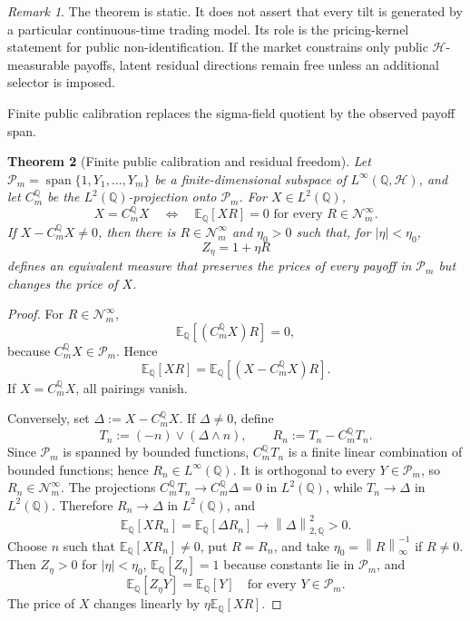 \documentclass[11pt,a4paper]{amsart}
\theoremstyle{plain}
\newtheorem{theorem}{Theorem}[section]
\theoremstyle{definition}
\theoremstyle{remark}
\newtheorem{remark}[theorem]{Remark}
\DeclareMathOperator{\Span}{span}
\newcommand{\QQ}{\mathbb{Q}}
\newcommand{\EE}{\mathbb{E}}
\newcommand{\cH}{\mathcal{H}}
\newcommand{\cN}{\mathcal{N}}
\newcommand{\cP}{\mathcal{P}}
\newcommand{\norm}[1]{\left\lVert #1\right\rVert}
\begin{document}
\begin{remark}
The theorem is static.  It does not assert that every tilt is generated by a particular
continuous-time trading model.  Its role is the pricing-kernel statement for public
non-identification.  If the market constrains only public \(\cH\)-measurable payoffs, latent
residual directions remain free unless an additional selector is imposed.
\end{remark}

Finite public calibration replaces the sigma-field quotient by the observed payoff span.

\begin{theorem}[Finite public calibration and residual freedom]\label{thm:finite-calibration}
Let \(\cP_m=\Span\{1,Y_1,\ldots,Y_m\}\) be a finite-dimensional subspace of
\(L^\infty(\QQ,\cH)\),
and let \(C_m^{\QQ}\) be the \(L^2(\QQ)\)-projection onto \(\cP_m\).  For \(X\in L^2(\QQ)\),
\[
        X=C_m^{\QQ}X
        \quad\Longleftrightarrow\quad
        \EE_\QQ[XR]=0
        \text{ for every }R\in\cN_m^\infty.
\]
If \(X-C_m^\QQ X\ne0\), then there is \(R\in\cN_m^\infty\) and \(\eta_0>0\) such that, for
\(|\eta|<\eta_0\),
\[
        Z_\eta=1+\eta R
\]
defines an equivalent measure that preserves the prices of every payoff in \(\cP_m\) but changes
the price of \(X\).
\end{theorem}

\begin{proof}
For \(R\in\cN_m^\infty\),
\[
        \EE_\QQ[(C_m^\QQ X)R]=0,
\]
because \(C_m^\QQ X\in\cP_m\).  Hence
\[
        \EE_\QQ[XR]=\EE_\QQ[(X-C_m^\QQ X)R].
\]
If \(X=C_m^\QQ X\), all pairings vanish.

Conversely, set \(\Delta:=X-C_m^\QQ X\).  If \(\Delta\ne0\), define
\[
        T_n:=(-n)\vee(\Delta\wedge n),
        \qquad
        R_n:=T_n-C_m^\QQ T_n.
\]
Since \(\cP_m\) is spanned by bounded functions, \(C_m^\QQ T_n\) is a finite linear combination of
bounded functions; hence \(R_n\in L^\infty(\QQ)\).  It is orthogonal to every \(Y\in\cP_m\), so
\(R_n\in\cN_m^\infty\).  The projections \(C_m^\QQ T_n\to C_m^\QQ\Delta=0\) in \(L^2(\QQ)\), while
\(T_n\to\Delta\) in \(L^2(\QQ)\).  Therefore \(R_n\to\Delta\) in \(L^2(\QQ)\), and
\[
        \EE_\QQ[XR_n]
        =
        \EE_\QQ[\Delta R_n]
        \to
        \norm{\Delta}_{2,\QQ}^2>0.
\]
Choose \(n\) such that \(\EE_\QQ[XR_n]\ne0\), put \(R=R_n\), and take
\(\eta_0=\norm{R}_\infty^{-1}\) if \(R\ne0\).  Then \(Z_\eta>0\) for \(|\eta|<\eta_0\),
\(\EE_\QQ[Z_\eta]=1\) because constants lie in \(\cP_m\), and
\[
        \EE_\QQ[Z_\eta Y]=\EE_\QQ[Y]
        \quad\text{for every }Y\in\cP_m.
\]
The price of \(X\) changes linearly by \(\eta\EE_\QQ[XR]\).
\end{proof}
\end{document}

